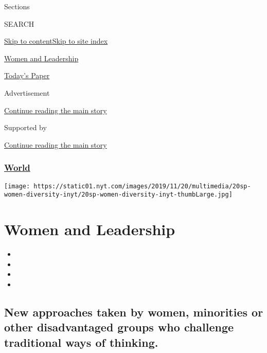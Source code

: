 Sections

SEARCH

\protect\hyperlink{site-content}{Skip to
content}\protect\hyperlink{site-index}{Skip to site index}

\href{https://www.nytimes.com/spotlight/women-and-leadership}{Women and
Leadership}

\href{https://myaccount.nytimes.com/auth/login?response_type=cookie\&client_id=vi}{}

\href{https://www.nytimes.com/section/todayspaper}{Today's Paper}

Advertisement

\protect\hyperlink{after-top}{Continue reading the main story}

Supported by

\protect\hyperlink{after-sponsor}{Continue reading the main story}

\hypertarget{world}{%
\subsubsection{\texorpdfstring{\href{/section/world}{World}}{World}}\label{world}}

\texttt{[image: https://static01.nyt.com/images/2019/11/20/multimedia/20sp-women-diversity-inyt/20sp-women-diversity-inyt-thumbLarge.jpg]}

\hypertarget{women-and-leadership}{%
\section{Women and Leadership}\label{women-and-leadership}}

\begin{itemize}
\item
\item
\item
\item
\end{itemize}

\hypertarget{new-approaches-taken-by-women-minorities-or-other-disadvantaged-groups-who-challenge-traditional-ways-of-thinking}{%
\subsection{New approaches taken by women, minorities or other
disadvantaged groups who challenge traditional ways of
thinking.}\label{new-approaches-taken-by-women-minorities-or-other-disadvantaged-groups-who-challenge-traditional-ways-of-thinking}}

